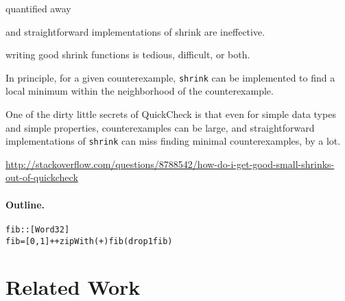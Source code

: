 \documentclass[9pt]{sigplanconf}
\newenvironment{code}{\begin{alltt}\footnotesize}{\end{alltt}}
\newcommand{\ttp}[1]{\texttt{#1}}
\begin{document}
quantified away

and straightforward
implementations of shrink are ineffective.

writing good shrink functions is tedious, difficult, or
both.  

In principle, for a given counterexample, \ttp{shrink} can be implemented to
find a local minimum within the neighborhood of the counterexample.  



One of the
dirty little secrets of QuickCheck is that even for simple data types and simple
properties, counterexamples can be large, and straightforward implementations of
\ttp{shrink} can miss finding minimal counterexamples, by a lot.








\url{http://stackoverflow.com/questions/8788542/how-do-i-get-good-small-shrinks-out-of-quickcheck}

\paragraph{Outline.}


\begin{code}
fib :: [Word32]
fib = [0,1] ++ zipWith (+) fib (drop 1 fib)
\end{code}
%

\section{Related Work}
\label{sec:related}
\end{document}
